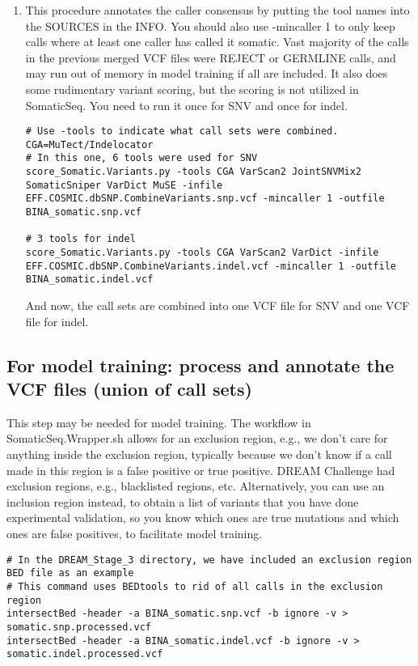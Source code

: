 \documentclass[10pt,letterpaper]{article}
\begin{document}
\begin{sloppypar}
\begin{enumerate}
		
	
\item
This procedure annotates the caller consensus by putting the tool names into the SOURCES in the INFO. You should also use -mincaller 1 to only keep calls where at least one caller has called it somatic. Vast majority of the calls in the previous merged VCF files were REJECT or GERMLINE calls, and may run out of memory in model training if all are included. It also does some rudimentary variant scoring, but the scoring is not utilized in SomaticSeq. You need to run it once for SNV and once for indel. 
	
\begin{lstlisting}
# Use -tools to indicate what call sets were combined. CGA=MuTect/Indelocator
# In this one, 6 tools were used for SNV
score_Somatic.Variants.py -tools CGA VarScan2 JointSNVMix2 SomaticSniper VarDict MuSE -infile EFF.COSMIC.dbSNP.CombineVariants.snp.vcf -mincaller 1 -outfile BINA_somatic.snp.vcf
	
# 3 tools for indel
score_Somatic.Variants.py -tools CGA VarScan2 VarDict -infile EFF.COSMIC.dbSNP.CombineVariants.indel.vcf -mincaller 1 -outfile BINA_somatic.indel.vcf
\end{lstlisting}
	
And now, the call sets are combined into one VCF file for SNV and one VCF file for indel.


\end{enumerate}





\subsection{For model training: process and annotate the VCF files (union of call sets)}

This step may be needed for model training. The workflow in SomaticSeq.Wrapper.sh allows for an exclusion region, e.g., we don't care for anything inside the exclusion region, typically because we don't know if a call made in this region is a false positive or true positive. DREAM Challenge had exclusion regions, e.g., blacklisted regions, etc. Alternatively, you can use an inclusion region instead, to obtain a list of variants that you have done experimental validation, so you know which ones are true mutations and which ones are false positives, to facilitate model training. 
	
\begin{lstlisting}
# In the DREAM_Stage_3 directory, we have included an exclusion region BED file as an example
# This command uses BEDtools to rid of all calls in the exclusion region
intersectBed -header -a BINA_somatic.snp.vcf -b ignore -v > somatic.snp.processed.vcf
intersectBed -header -a BINA_somatic.indel.vcf -b ignore -v > somatic.indel.processed.vcf
	

\end{lstlisting}
\end{sloppypar}
\end{document}
